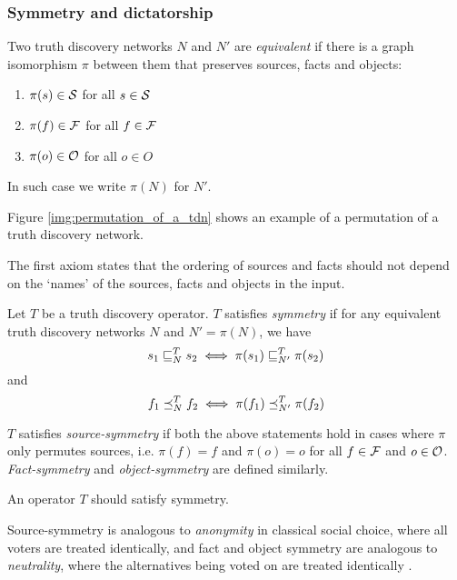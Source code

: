 \documentclass[../main.tex]{subfiles}
\begin{document}

\subsubsection{Symmetry and dictatorship}

\begin{definition}
Two truth discovery networks $N$ and $N'$ are \emph{equivalent} if there is a
graph isomorphism $\pi$ between them that preserves sources, facts and objects:
\begin{enumerate}
\item $\pi(s) \in \S$ for all $s \in \S$
\item $\pi(f) \in \F$ for all $f \in \F$
\item $\pi(o) \in \O$ for all $o \in O$
\end{enumerate}

In such case we write $\pi(N)$ for $N'$.
\end{definition}

Figure \ref{img:permutation_of_a_tdn} shows an example of a permutation of a
truth discovery network.

The first axiom states that the ordering of sources and facts should not depend
on the `names' of the sources, facts and objects in the input.

\begin{definition}
Let $T$ be a truth discovery operator. $T$ satisfies \emph{symmetry} if for
any equivalent truth discovery networks $N$ and $N' = \pi(N)$, we have
$$ s_1 \sle_N^T s_2 \iff \pi(s_1) \sle_{N'}^T \pi(s_2) $$
and
$$ f_1 \fle_N^T f_2 \iff \pi(f_1) \fle_{N'}^T \pi(f_2) $$

$T$ satisfies \emph{source-symmetry} if both the above statements hold in cases
where $\pi$ only permutes sources, i.e. $\pi(f)=f$ and $\pi(o)=o$ for all $f
\in \F$ and $o \in \O$. \emph{Fact-symmetry} and \emph{object-symmetry} are
defined similarly.
\end{definition}

\begin{axiom}[Symmetry]
\label{axiom:symm}
An operator $T$ should satisfy symmetry.
\end{axiom}

Source-symmetry is analogous to \emph{anonymity} in classical social choice,
where all voters are treated identically, and fact and object symmetry are
analogous to \emph{neutrality}, where the alternatives being
voted on are treated identically \cite{handbook_voting}.
\end{document}
